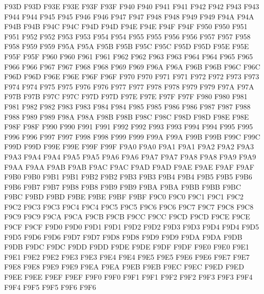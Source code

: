 \ID F93D F93D
\ID F93E F93E
\ID F93F F93F
\ID F940 F940
\ID F941 F941
\ID F942 F942
\ID F943 F943
\ID F944 F944
\ID F945 F945
\ID F946 F946
\ID F947 F947
\ID F948 F948
\ID F949 F949
\ID F94A F94A
\ID F94B F94B
\ID F94C F94C
\ID F94D F94D
\ID F94E F94E
\ID F94F F94F
\ID F950 F950
\ID F951 F951
\ID F952 F952
\ID F953 F953
\ID F954 F954
\ID F955 F955
\ID F956 F956
\ID F957 F957
\ID F958 F958
\ID F959 F959
\ID F95A F95A
\ID F95B F95B
\ID F95C F95C
\ID F95D F95D
\ID F95E F95E
\ID F95F F95F
\ID F960 F960
\ID F961 F961
\ID F962 F962
\ID F963 F963
\ID F964 F964
\ID F965 F965
\ID F966 F966
\ID F967 F967
\ID F968 F968
\ID F969 F969
\ID F96A F96A
\ID F96B F96B
\ID F96C F96C
\ID F96D F96D
\ID F96E F96E
\ID F96F F96F
\ID F970 F970
\ID F971 F971
\ID F972 F972
\ID F973 F973
\ID F974 F974
\ID F975 F975
\ID F976 F976
\ID F977 F977
\ID F978 F978
\ID F979 F979
\ID F97A F97A
\ID F97B F97B
\ID F97C F97C
\ID F97D F97D
\ID F97E F97E
\ID F97F F97F
\ID F980 F980
\ID F981 F981
\ID F982 F982
\ID F983 F983
\ID F984 F984
\ID F985 F985
\ID F986 F986
\ID F987 F987
\ID F988 F988
\ID F989 F989
\ID F98A F98A
\ID F98B F98B
\ID F98C F98C
\ID F98D F98D
\ID F98E F98E
\ID F98F F98F
\ID F990 F990
\ID F991 F991
\ID F992 F992
\ID F993 F993
\ID F994 F994
\ID F995 F995
\ID F996 F996
\ID F997 F997
\ID F998 F998
\ID F999 F999
\ID F99A F99A
\ID F99B F99B
\ID F99C F99C
\ID F99D F99D
\ID F99E F99E
\ID F99F F99F
\ID F9A0 F9A0
\ID F9A1 F9A1
\ID F9A2 F9A2
\ID F9A3 F9A3
\ID F9A4 F9A4
\ID F9A5 F9A5
\ID F9A6 F9A6
\ID F9A7 F9A7
\ID F9A8 F9A8
\ID F9A9 F9A9
\ID F9AA F9AA
\ID F9AB F9AB
\ID F9AC F9AC
\ID F9AD F9AD
\ID F9AE F9AE
\ID F9AF F9AF
\ID F9B0 F9B0
\ID F9B1 F9B1
\ID F9B2 F9B2
\ID F9B3 F9B3
\ID F9B4 F9B4
\ID F9B5 F9B5
\ID F9B6 F9B6
\ID F9B7 F9B7
\ID F9B8 F9B8
\ID F9B9 F9B9
\ID F9BA F9BA
\ID F9BB F9BB
\ID F9BC F9BC
\ID F9BD F9BD
\ID F9BE F9BE
\ID F9BF F9BF
\ID F9C0 F9C0
\ID F9C1 F9C1
\ID F9C2 F9C2
\ID F9C3 F9C3
\ID F9C4 F9C4
\ID F9C5 F9C5
\ID F9C6 F9C6
\ID F9C7 F9C7
\ID F9C8 F9C8
\ID F9C9 F9C9
\ID F9CA F9CA
\ID F9CB F9CB
\ID F9CC F9CC
\ID F9CD F9CD
\ID F9CE F9CE
\ID F9CF F9CF
\ID F9D0 F9D0
\ID F9D1 F9D1
\ID F9D2 F9D2
\ID F9D3 F9D3
\ID F9D4 F9D4
\ID F9D5 F9D5
\ID F9D6 F9D6
\ID F9D7 F9D7
\ID F9D8 F9D8
\ID F9D9 F9D9
\ID F9DA F9DA
\ID F9DB F9DB
\ID F9DC F9DC
\ID F9DD F9DD
\ID F9DE F9DE
\ID F9DF F9DF
\ID F9E0 F9E0
\ID F9E1 F9E1
\ID F9E2 F9E2
\ID F9E3 F9E3
\ID F9E4 F9E4
\ID F9E5 F9E5
\ID F9E6 F9E6
\ID F9E7 F9E7
\ID F9E8 F9E8
\ID F9E9 F9E9
\ID F9EA F9EA
\ID F9EB F9EB
\ID F9EC F9EC
\ID F9ED F9ED
\ID F9EE F9EE
\ID F9EF F9EF
\ID F9F0 F9F0
\ID F9F1 F9F1
\ID F9F2 F9F2
\ID F9F3 F9F3
\ID F9F4 F9F4
\ID F9F5 F9F5
\ID F9F6 F9F6
